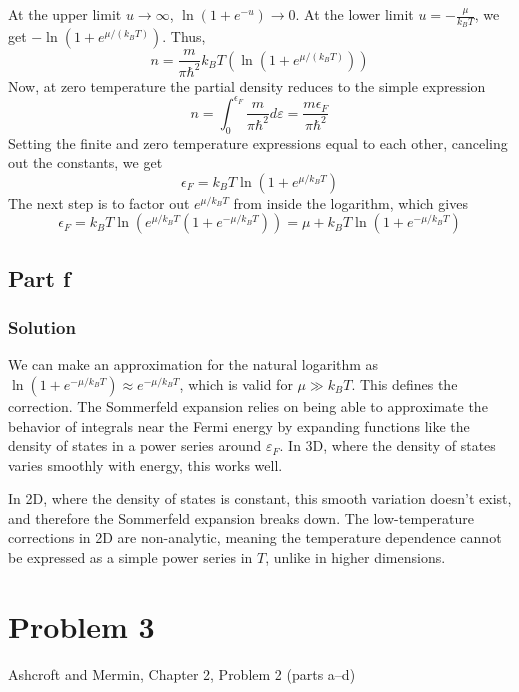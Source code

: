 \documentclass[12pt]{article}
\begin{document}
At the upper limit \( u \to \infty \), \( \ln(1 + e^{-u}) \to 0 \). At the lower limit \( u = -\frac{\mu}{k_B T} \), we get \( -\ln(1 + e^{\mu/(k_B T)}) \). Thus, 
\begin{equation}
    n = \frac{m}{\pi \hbar^2} k_B T \left( \ln(1 + e^{\mu/(k_B T)}) \right)
\end{equation}
Now, at zero temperature the partial density reduces to the simple expression
\begin{equation}
    n = \int_{0}^{\epsilon _{F}} \frac{m}{\pi \hbar^2} d \varepsilon = \frac{m \epsilon _{F}}{\pi \hbar^2}
\end{equation}
Setting the finite and zero temperature expressions equal to each other, canceling out the constants, we get
\begin{equation}
    \epsilon_F = k_B T \ln(1 + e^{\mu / k_B T})
\end{equation}
The next step is to factor out \( e^{\mu / k_B T} \) from inside the logarithm, which gives
\begin{equation}
    \epsilon_F = k_B T \ln (e^{\mu / k_B T}(1 + e^{-\mu / k_B T})) = \mu + k_B T \ln (1 + e^{-\mu / k_B T})
\end{equation}


\subsection{Part f}
\subsubsection{Solution}
We can make an approximation for the natural logarithm as $\ln(1+e^{-\mu/k_BT}) \approx e^{-\mu/k_BT}$, which is valid for $\mu \gg k_BT$. This defines the correction.
The Sommerfeld expansion relies on being able to approximate the behavior of integrals near the Fermi energy by expanding functions like the density of states in a power series around \(\varepsilon_F\). In 3D, where the density of states varies smoothly with energy, this works well.

In 2D, where the density of states is constant, this smooth variation doesn't exist, and therefore the Sommerfeld expansion breaks down. The low-temperature corrections in 2D are non-analytic, meaning the temperature dependence cannot be expressed as a simple power series in \(T\), unlike in higher dimensions.
\section{Problem 3}
Ashcroft and Mermin, Chapter 2, Problem 2 (parts a--d)
\end{document}
